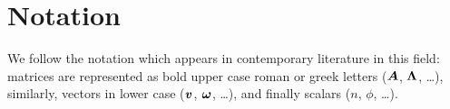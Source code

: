
\section{Notation}
\label{sec:1-introduction-notation}

We follow the notation which appears in contemporary literature in this field:
matrices are represented as bold upper case roman or greek letters ($\boldsymbol{A}$, $\boldsymbol{\Lambda}$, \dots), 
similarly, vectors in lower case ($\boldsymbol{v}$, $\boldsymbol{\omega}$, \dots), and finally
scalars ($n$, $\phi$, \dots).
